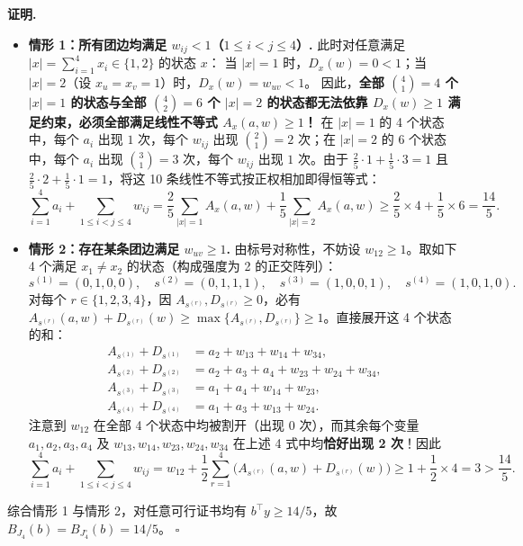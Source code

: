 \documentclass[11pt,a4paper]{ctexart}
\theoremstyle{definition}
\newenvironment{proofcn}{\par\noindent\textbf{证明.}\ }{\hfill$\square$\par}
\newcommand{\1}{\boldsymbol 1}
\newcommand{\0}{\boldsymbol 0}
\begin{document}
\begin{proofcn}
\begin{itemize}
\item \textbf{情形 1：所有团边均满足 $w_{ij}<1$（$1\le i<j\le 4$）.}
此时对任意满足 $|x|=\sum_{i=1}^4 x_i\in\{1,2\}$ 的状态 $x$：
当 $|x|=1$ 时，$D_x(w)=0<1$；当 $|x|=2$（设 $x_u=x_v=1$）时，$D_x(w)=w_{uv}<1$。
因此，\textbf{全部 $\binom{4}{1}=4$ 个 $|x|=1$ 的状态与全部 $\binom{4}{2}=6$ 个 $|x|=2$ 的状态都无法依靠 $D_x(w)\ge 1$ 满足约束，必须全部满足线性不等式 $A_x(a,w)\ge 1$！}
在 $|x|=1$ 的 4 个状态中，每个 $a_i$ 出现 $1$ 次，每个 $w_{ij}$ 出现 $\binom{2}{1}=2$ 次；在 $|x|=2$ 的 6 个状态中，每个 $a_i$ 出现 $\binom{3}{1}=3$ 次，每个 $w_{ij}$ 出现 $1$ 次。由于 $\frac{2}{5}\cdot 1+\frac{1}{5}\cdot 3=1$ 且 $\frac{2}{5}\cdot 2+\frac{1}{5}\cdot 1=1$，将这 10 条线性不等式按正权相加即得恒等式：
\begin{equation}\label{eq:J4_case1}
 \sum_{i=1}^4 a_i + \sum_{1\le i<j\le 4} w_{ij}
 = \frac{2}{5}\sum_{|x|=1} A_x(a,w) + \frac{1}{5}\sum_{|x|=2} A_x(a,w)
 \ge \frac{2}{5}\times 4 + \frac{1}{5}\times 6 = \frac{14}{5}.
\end{equation}

\item \textbf{情形 2：存在某条团边满足 $w_{uv}\ge 1$.}
由标号对称性，不妨设 $w_{12}\ge 1$。取如下 4 个满足 $x_1\neq x_2$ 的状态（构成强度为 2 的正交阵列）：
\[
 s^{(1)}=(0,1,0,0),\quad s^{(2)}=(0,1,1,1),\quad s^{(3)}=(1,0,0,1),\quad s^{(4)}=(1,0,1,0).
\]
对每个 $r\in\{1,2,3,4\}$，因 $A_{s^{(r)}},D_{s^{(r)}}\ge 0$，必有 $A_{s^{(r)}}(a,w)+D_{s^{(r)}}(w)\ge\max\{A_{s^{(r)}},D_{s^{(r)}}\}\ge 1$。直接展开这 4 个状态的和：
\[
\begin{aligned}
 A_{s^{(1)}}+D_{s^{(1)}} &= a_2 + w_{13} + w_{14} + w_{34},\\
 A_{s^{(2)}}+D_{s^{(2)}} &= a_2 + a_3 + a_4 + w_{23} + w_{24} + w_{34},\\
 A_{s^{(3)}}+D_{s^{(3)}} &= a_1 + a_4 + w_{14} + w_{23},\\
 A_{s^{(4)}}+D_{s^{(4)}} &= a_1 + a_3 + w_{13} + w_{24}.
\end{aligned}
\]
注意到 $w_{12}$ 在全部 4 个状态中均被割开（出现 $0$ 次），而其余每个变量 $a_1,a_2,a_3,a_4$ 及 $w_{13},w_{14},w_{23},w_{24},w_{34}$ 在上述 4 式中均\textbf{恰好出现 2 次}！因此
\begin{equation}\label{eq:J4_case2}
 \sum_{i=1}^4 a_i + \sum_{1\le i<j\le 4} w_{ij}
 = w_{12} + \frac{1}{2}\sum_{r=1}^4\bigl(A_{s^{(r)}}(a,w)+D_{s^{(r)}}(w)\bigr)
 \ge 1 + \frac{1}{2}\times 4 = 3 > \frac{14}{5}.
\end{equation}
\end{itemize}
综合情形 1 与情形 2，对任意可行证书均有 $b^\top y\ge 14/5$，故 $B_{J_4}(b)=B_{J_4^\circ}(b)=14/5$。
\end{proofcn}
\end{document}
